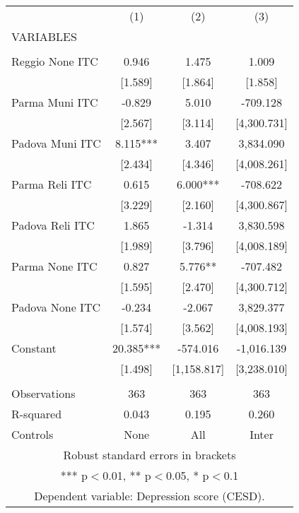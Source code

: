 \begin{tabular}{lccc} \hline
 & (1) & (2) & (3) \\
VARIABLES &  &  &  \\ \hline
 &  &  &  \\
Reggio None ITC & 0.946 & 1.475 & 1.009 \\
 & [1.589] & [1.864] & [1.858] \\
Parma Muni ITC & -0.829 & 5.010 & -709.128 \\
 & [2.567] & [3.114] & [4,300.731] \\
Padova Muni ITC & 8.115*** & 3.407 & 3,834.090 \\
 & [2.434] & [4.346] & [4,008.261] \\
Parma Reli ITC & 0.615 & 6.000*** & -708.622 \\
 & [3.229] & [2.160] & [4,300.867] \\
Padova Reli ITC & 1.865 & -1.314 & 3,830.598 \\
 & [1.989] & [3.796] & [4,008.189] \\
Parma None ITC & 0.827 & 5.776** & -707.482 \\
 & [1.595] & [2.470] & [4,300.712] \\
Padova None ITC & -0.234 & -2.067 & 3,829.377 \\
 & [1.574] & [3.562] & [4,008.193] \\
Constant & 20.385*** & -574.016 & -1,016.139 \\
 & [1.498] & [1,158.817] & [3,238.010] \\
 &  &  &  \\
Observations & 363 & 363 & 363 \\
R-squared & 0.043 & 0.195 & 0.260 \\
 Controls & None & All & Inter \\ \hline
\multicolumn{4}{c}{ Robust standard errors in brackets} \\
\multicolumn{4}{c}{ *** p$<$0.01, ** p$<$0.05, * p$<$0.1} \\
\multicolumn{4}{c}{ Dependent variable: Depression score (CESD).} \\
\end{tabular}
